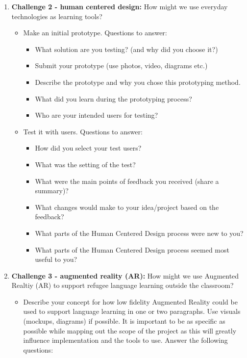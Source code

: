 \documentclass[12pt,twoside,vi]{mitthesis}
\begin{document}
\begin{enumerate}
\begin{itemize}
\begin{itemize}
\end{itemize}
\end{itemize}
\item \textbf{Challenge 2 - human centered design:} How might we use everyday technologies as learning tools?
\begin{itemize}
\item Make an initial prototype. Questions to answer:
\begin{itemize}
\item What solution are you testing? (and why did you choose it?)
\item Submit your prototype (use photos, video, diagrams etc.)
\item Describe the prototype and why you chose this prototyping method. 
\item What did you learn during the prototyping process?
\item Who are your intended users for testing?
\end{itemize}
\item Test it with users. Questions to answer:
\begin{itemize}
\item How did you select your test users? 
\item What was the setting of the test? 
\item What were the main points of feedback you received (share a summary)? 
\item What changes would make to your idea/project based on the feedback?
\item What parts of the Human Centered Design process were new to you?
\item What parts of the Human Centered Design process seemed most useful to you?
\end{itemize}
\end{itemize}
\item \textbf{Challenge 3 - augmented reality (AR):} How might we use Augmented Realtiy (AR) to support refugee language learning outside the classroom?
\begin{itemize}
\item Describe your concept for how low fidelity Augmented Reality could be used to support language learning in one or two paragraphs. Use visuals (mockups, diagrams) if possible. It is important to be as specific as possible while mapping out the scope of the project as this will greatly influence implementation and the tools to use. Answer the following questions:
\begin{itemize}

\end{itemize}
\end{itemize}
\end{enumerate}
\end{document}

